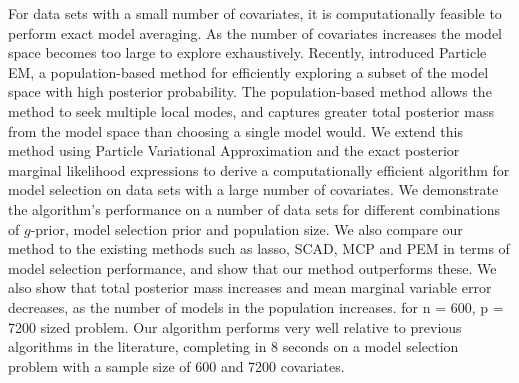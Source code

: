 \documentclass[PhD,stats]{usydthesis}[12pt]
\begin{document}
For data sets with a small number of covariates, it is computationally feasible to perform exact model
averaging. As the number of covariates increases the model space becomes too large to explore exhaustively.
Recently, \cite{Rockova2017} introduced Particle EM, a population-based method for efficiently exploring a
subset of the model space with high posterior probability. The population-based method allows the method to
seek multiple local modes, and captures greater total posterior mass from the model space than choosing a
single model would. We extend this method using Particle Variational Approximation and the exact posterior
marginal likelihood expressions to derive a computationally efficient algorithm for model selection on data
sets with a large number of covariates. We demonstrate the algorithm's performance on a number of data sets
for different combinations of $g$-prior, model selection prior and population size. We also compare our method
to the existing methods such as lasso, SCAD, MCP and PEM in terms of model selection performance,  and show
that our method outperforms these. We also show that total posterior mass increases and mean marginal variable
error decreases, as the number of models in the population increases. %
for n = 600, p = 7200 sized problem. Our algorithm performs very well relative to previous algorithms in the
literature, completing in 8 seconds on a model selection problem with a sample size of 600 and 7200
covariates.







% 

\backmatter
\appendix




\end{document}
